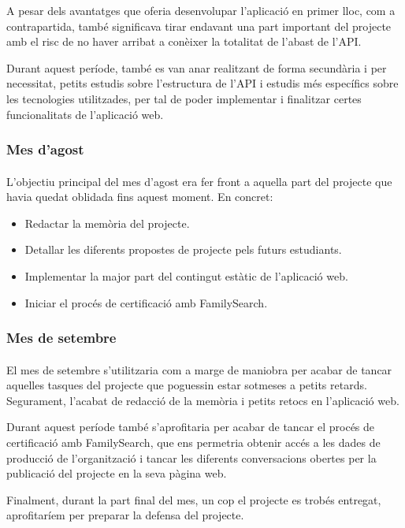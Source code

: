             A pesar dels avantatges que oferia desenvolupar l'aplicació en primer lloc, com a contrapartida, també significava tirar endavant una part important del projecte amb el risc de no haver arribat a conèixer la totalitat de l'abast de l'\gls{API}.

            Durant aquest període, també es van anar realitzant de forma secundària i per necessitat, petits estudis sobre l’estructura de l’API i estudis més específics sobre les tecnologies utilitzades, per tal de poder implementar i finalitzar certes funcionalitats de l’aplicació web.

        \subsubsection{Mes d'agost}

            \paragraph{}
            L'objectiu principal del mes d'agost era fer front a aquella part del projecte que havia quedat oblidada fins aquest moment. En concret:

            \begin{itemize}
                \item Redactar la memòria del projecte.
                \item Detallar les diferents propostes de projecte pels futurs estudiants.
                \item Implementar la major part del contingut estàtic de l'aplicació web.
                \item Iniciar el procés de certificació amb FamilySearch.
            \end{itemize}

        \subsubsection{Mes de setembre}

            \paragraph{}
            El mes de setembre s'utilitzaria com a marge de maniobra per acabar de tancar aquelles tasques del projecte que poguessin estar sotmeses a petits retards. Segurament, l'acabat de redacció de la memòria i petits retocs en l'aplicació web.

            Durant aquest període també s'aprofitaria per acabar de tancar el procés de certificació amb FamilySearch, que ens permetria obtenir accés a les dades de producció de l'organització i tancar les diferents conversacions obertes per la publicació del projecte en la seva pàgina web.

            Finalment, durant la part final del mes, un cop el projecte es trobés entregat, aprofitaríem per preparar la defensa del projecte.
